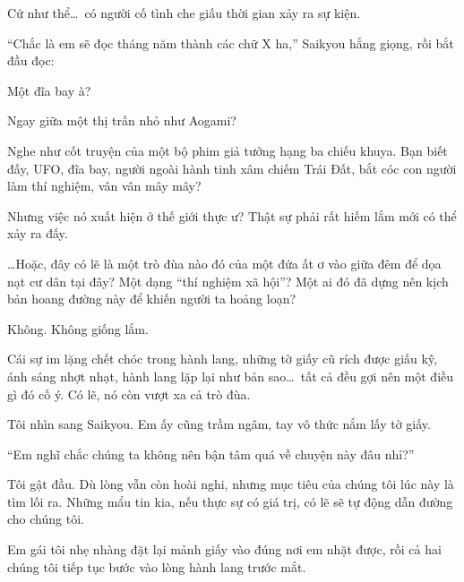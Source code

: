 \documentclass[../main.tex]{subfiles}
\begin{document}
Cứ như thể\dots\ có người cố tình che giấu thời gian xảy ra sự kiện.

``Chắc là em sẽ đọc tháng năm thành các chữ X ha,'' Saikyou hắng giọng, rồi bắt đầu đọc:


Một đĩa bay à?

Ngay giữa một thị trấn nhỏ như Aogami?

Nghe như cốt truyện của một bộ phim giả tưởng hạng ba chiếu khuya. Bạn biết đấy, UFO, đĩa bay, người ngoài hành tinh xâm chiếm Trái Đất, bắt cóc con người làm thí nghiệm, vân vân mây mây?

Nhưng việc nó xuất hiện ở thế giới thực ư? Thật sự phải rất hiếm lắm mới có thể xảy ra đấy.

\dots Hoặc, đây có lẽ là một trò đùa nào đó của một đứa ất ơ vào giữa đêm để dọa nạt cư dân tại đây? Một dạng ``thí nghiệm xã hội''? Một ai đó đã dựng nên kịch bản hoang đường này để khiến người ta hoảng loạn?

Không. Không giống lắm.

Cái sự im lặng chết chóc trong hành lang, những tờ giấy cũ rích được giấu kỹ, ánh sáng nhợt nhạt, hành lang lặp lại như bản sao\dots\ tất cả đều gợi nên một điều gì đó cố ý. Có lẽ, nó còn vượt xa cả trò đùa.

Tôi nhìn sang Saikyou. Em ấy cũng trầm ngâm, tay vô thức nắm lấy tờ giấy.

``Em nghĩ chắc chúng ta không nên bận tâm quá về chuyện này đâu nhỉ?''

Tôi gật đầu. Dù lòng vẫn còn hoài nghi, nhưng mục tiêu của chúng tôi lúc này là tìm lối ra. Những mẩu tin kia, nếu thực sự có giá trị, có lẽ sẽ tự động dẫn đường cho chúng tôi.

Em gái tôi nhẹ nhàng đặt lại mảnh giấy vào đúng nơi em nhặt được, rồi cả hai chúng tôi tiếp tục bước vào lòng hành lang trước mắt.
\end{document}
